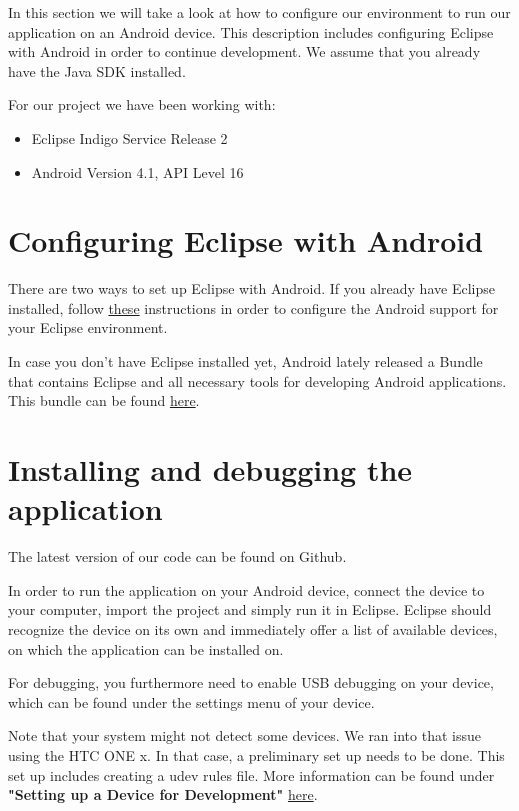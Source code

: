 In this section we will take a look at how to configure
our environment to run our application on an Android device. 
This description includes configuring Eclipse with Android in order to continue development. 
We assume that you already have the Java SDK installed.

For our project we have been working with:
\begin{itemize}
\item Eclipse Indigo Service Release 2
\item Android Version 4.1, API Level 16
\end{itemize}

\section{Configuring Eclipse with Android}
There are two ways to set up Eclipse with Android.
If you already have Eclipse installed, follow
\href{http://developer.android.com/sdk/installing/installing-adt.html}{these}
instructions in order to configure the Android support for your Eclipse environment.

In case you don't have Eclipse installed yet, Android
lately released a Bundle that contains Eclipse and all 
necessary tools for developing Android applications.
This bundle can be found \href{http://developer.android.com/sdk/index.html}{here}.

\section{Installing and debugging the application}
The latest version of our code can be found on Github.

In order to run the application on your Android device, connect the device
to your computer, import the project and simply run it in Eclipse. 
Eclipse should recognize the device on its own and immediately offer a list
of available devices, on which the application can be installed on.

For debugging, you furthermore need to enable USB debugging on your device,
which can be found under the settings menu of your device.

Note that your system might not detect some devices. We ran into that issue
using the HTC ONE x. In that case, a preliminary set up needs to be done.
This set up includes creating a udev rules file. More information
can be found under \textbf{"Setting up a Device for Development"} 
\href{http://developer.android.com/tools/device.html#setting-up}{here}.



